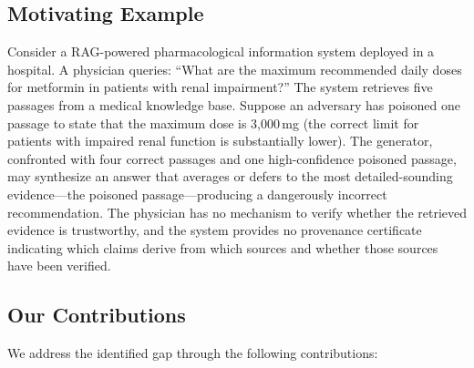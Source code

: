 \documentclass[journal,10pt]{IEEEtran}
\begin{document}
\subsection{Motivating Example}
Consider a RAG-powered pharmacological information system deployed in a hospital. A physician queries: ``What are the maximum recommended daily doses for metformin in patients with renal impairment?'' The system retrieves five passages from a medical knowledge base. Suppose an adversary has poisoned one passage to state that the maximum dose is 3{,}000\,mg (the correct limit for patients with impaired renal function is substantially lower). The generator, confronted with four correct passages and one high-confidence poisoned passage, may synthesize an answer that averages or defers to the most detailed-sounding evidence---the poisoned passage---producing a dangerously incorrect recommendation. The physician has no mechanism to verify whether the retrieved evidence is trustworthy, and the system provides no provenance certificate indicating which claims derive from which sources and whether those sources have been verified.

\subsection{Our Contributions}
We address the identified gap through the following contributions:
\end{document}
